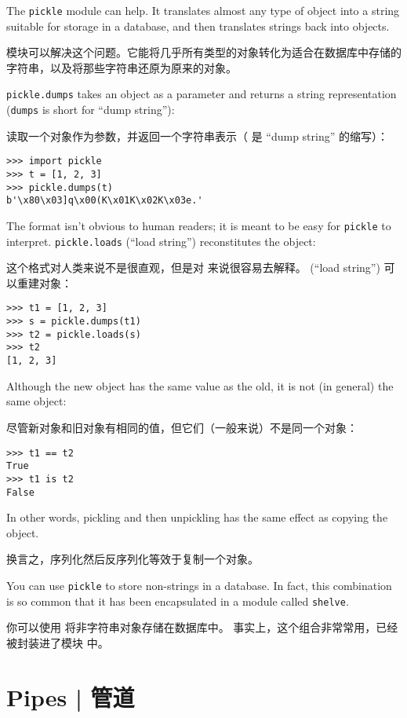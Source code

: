 {{{{{{{The {\tt pickle} module can help.  It translates
almost any type of object into a string suitable for storage in a
database, and then translates strings back into objects.

 模块可以解决这个问题。它能将几乎所有类型的对象转化为适合在数据库中存储的字符串，以及将那些字符串还原为原来的对象。

{\tt pickle.dumps} takes an object as a parameter and returns
a string representation ({\tt dumps} is short for ``dump string''):

 读取一个对象作为参数，并返回一个字符串表示（  是 ``dump string'' 的缩写）：

\begin{lstlisting}
>>> import pickle
>>> t = [1, 2, 3]
>>> pickle.dumps(t)
b'\x80\x03]q\x00(K\x01K\x02K\x03e.'
\end{lstlisting}
%
The format isn't obvious to human readers; it is meant to be
easy for {\tt pickle} to interpret.  {\tt pickle.loads}
(``load string'') reconstitutes the object:

这个格式对人类来说不是很直观，但是对  来说很容易去解释。  (``load string'') 可以重建对象：

\begin{lstlisting}
>>> t1 = [1, 2, 3]
>>> s = pickle.dumps(t1)
>>> t2 = pickle.loads(s)
>>> t2
[1, 2, 3]
\end{lstlisting}
%
Although the new object has the same value as the old, it is
not (in general) the same object:

尽管新对象和旧对象有相同的值，但它们（一般来说）不是同一个对象：

\begin{lstlisting}
>>> t1 == t2
True
>>> t1 is t2
False
\end{lstlisting}

%
In other words, pickling and then unpickling has the same effect
as copying the object.

换言之，序列化然后反序列化等效于复制一个对象。

You can use {\tt pickle} to store non-strings in a database.
In fact, this combination is so common that it has been
encapsulated in a module called {\tt shelve}.

你可以使用  将非字符串对象存储在数据库中。
事实上，这个组合非常常用，已经被封装进了模块  中。

  

\section{Pipes  |  管道}
  

}}}}}}}
